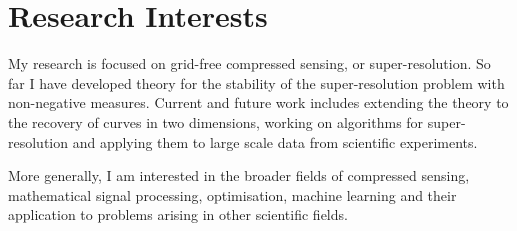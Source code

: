 \documentclass[11pt,a4paper,roman]{moderncv} %
\begin{document}


%
%
%
%
%


\makecvtitle %




\section{Research Interests}
My research is focused on grid-free compressed sensing, or super-resolution. 
So far I have developed theory for the stability of the super-resolution problem 
with non-negative measures. 
Current and future work includes extending the theory to the recovery 
of curves in two dimensions, working on algorithms for super-resolution and
applying them to large scale data from scientific experiments.
\newline

More generally, I am interested in the broader fields of compressed sensing, 
mathematical signal processing, optimisation, machine learning 
and their application to problems arising in other scientific fields.



\end{document}
